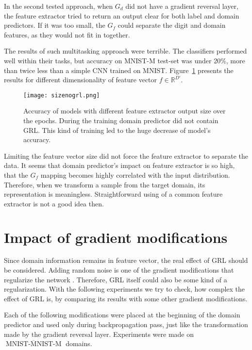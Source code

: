 \documentclass[shortabstract, inz, english]{iithesis}
\DeclareMathOperator{\mnistM}{MNIST-MNIST-M}
\newcommand{\mnist}{$\overline{\mnistM}$ }
\begin{document}
\par
In the second tested approach, when $G_{d}$ did not have a gradient reversal layer, the feature extractor tried to return an output clear for both label and domain predictors. If it was too small, the $G_{f}$ could separate the digit and domain features, as they would not fit in together.
\par
The results of such multitasking approach were terrible. The classifiers performed well within their tasks, but accuracy on MNIST-M test-set was under 20\%, more than twice less than a simple CNN trained on MNIST. Figure~\ref{fig:size_nogrl} presents the results for different dimensionality of feature vector $f \in \mathbb{R}^{D'}$.
\begin{figure}[htb]%
    \centering
    \texttt{[image: sizenogrl.png]}%
    \caption{Accuracy of models with different feature extractor output size over the epochs. During the training domain predictor did not contain GRL. This kind of training led to the huge decrease of model's accuracy.}
    \label{fig:size_nogrl}%
\end{figure}
\par
Limiting the feature vector size did not force the feature extractor to separate the data. It seems that domain predictor's impact on feature extractor is so high, that the $G_{f}$ mapping becomes highly correlated with the input distribution. Therefore, when we transform a sample from the target domain, its representation is meaningless. Straightforward using of a common feature extractor is not a good idea then.

\section{Impact of gradient modifications}
Since domain information remains in feature vector, the real effect of GRL should be considered. Adding random noise is one of the gradient modifications that regularize the network \cite{noise}. Therefore, GRL itself could also be some kind of a regularization. With the following experiments we try to check, how complex the effect of GRL is, by comparing its results with some other gradient modifications.
\par
Each of the following modifications were placed at the beginning of the domain predictor and used only during backpropagation pass, just like the transformation made by the gradient reversal layer. Experiments were made on \mnist domains.
\end{document}
